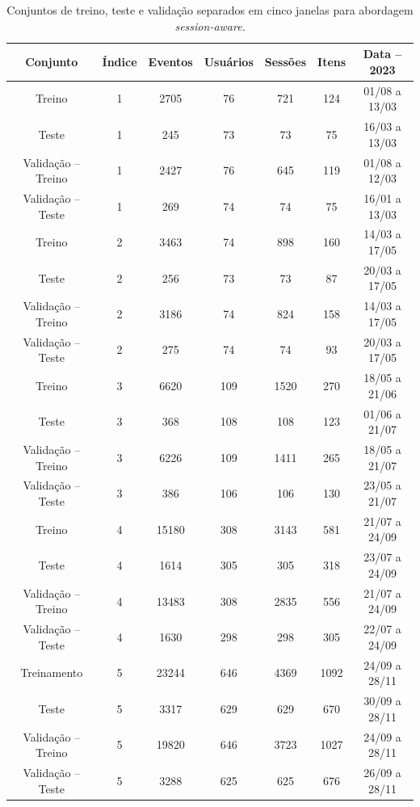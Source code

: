 \begin{table}[htbp]
  \centering
  \begin{tabular}{|c|c|c|c|c|c|c|}
    \hline
    Conjunto & Índice & Eventos & Usuários & Sessões & Itens & Data -- 2023\\
    \hline
    Treino & 1 & 2705 & 76 & 721 & 124 & 01/08 a 13/03\\
    \hline
    Teste & 1 & 245 & 73 & 73 & 75 & 16/03 a 13/03\\
    \hline
    Validação -- Treino & 1 & 2427 & 76 & 645 & 119 & 01/08 a 12/03\\
    \hline
    Validação -- Teste & 1 & 269 & 74 & 74 & 75 & 16/01 a 13/03\\
    \hline
    Treino & 2 & 3463 & 74 & 898 & 160 & 14/03 a 17/05\\
    \hline
    Teste & 2 & 256 & 73 & 73 & 87 & 20/03 a 17/05\\
    \hline
    Validação -- Treino & 2 & 3186 & 74 & 824 & 158 & 14/03 a 17/05\\
    \hline
    Validação -- Teste & 2 & 275 & 74 & 74 & 93 & 20/03 a 17/05\\    
    \hline
    Treino & 3 & 6620 & 109 & 1520 & 270 & 18/05 a 21/06\\
    \hline
    Teste & 3 & 368 & 108 & 108 & 123 & 01/06 a 21/07\\
    \hline
    Validação -- Treino & 3 & 6226 & 109 & 1411 & 265 & 18/05 a 21/07\\
    \hline
    Validação -- Teste & 3 & 386 & 106 & 106 & 130 & 23/05 a 21/07\\
    \hline
    Treino & 4 & 15180 & 308 & 3143 & 581 & 21/07 a 24/09\\
    \hline
    Teste & 4 & 1614 & 305 & 305 & 318 & 23/07 a 24/09\\
    \hline
    Validação -- Treino & 4 & 13483 & 308 & 2835 & 556 & 21/07 a 24/09\\
    \hline
    Validação -- Teste & 4 & 1630 & 298 & 298 & 305 & 22/07 a 24/09\\
    \hline
    Treinamento & 5 & 23244 & 646 & 4369 & 1092 & 24/09 a 28/11\\
    \hline
    Teste & 5 & 3317 & 629 & 629 & 670 & 30/09 a 28/11\\
    \hline
    Validação -- Treino & 5 & 19820 & 646 & 3723 & 1027 & 24/09 a 28/11\\
    \hline
    Validação -- Teste & 5 & 3288 & 625 & 625 & 676 & 26/09 a 28/11\\
    \hline
  \end{tabular}
  \caption{Conjuntos de treino, teste e validação separados em cinco janelas para abordagem \textit{session-aware}.}
  \label{tab:windowed_data_session_aware}
\end{table}

